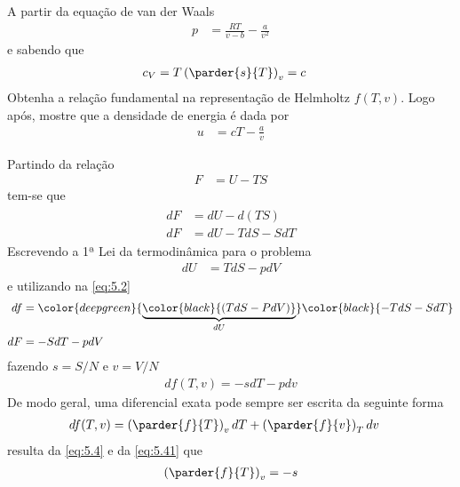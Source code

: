 \begin{prob}
	A partir da equação de van der Waals
	\begin{align}
		p&=\frac{RT}{v-b}-\frac{a}{v^2}
	\end{align}
	e sabendo que
	\begin{align}
		\label{eq:calor-especifico-vcte}
		c_V&=T\left(\parder{s}{T}\right)_v=c
	\end{align}
	Obtenha a relação fundamental na representação de Helmholtz $f(T,v)$. Logo após, mostre que a densidade de energia é dada por
	\begin{align}
		u&=cT-\frac{a}{v}
	\end{align}
	\begin{sol}
		Partindo da relação
		\begin{align}
			\label{eq:5.1}
			F&=U-TS
		\end{align}
		tem-se que
		\begin{align}
			\label{eq:5.2}
			\begin{split}
				dF&=dU-d(TS)\\
				dF&=dU-TdS-SdT
			\end{split}
		\end{align}
		Escrevendo a 1ª Lei da termodinâmica para o problema
		\begin{align}			
			dU&=TdS-pdV
			\label{eq:1-lei-termodinamica}
		\end{align}
		e utilizando na \eqref{eq:5.2}
		\begin{align}
			\begin{split}
				df&=\color{deepgreen}{\underbrace{\color{black}{(TdS-PdV)}}_{dU}}\color{black}{-TdS-SdT}\\
				dF&=-SdT-pdV
				\label{eq:5.3}
			\end{split}
		\end{align}
		fazendo $s=S/N$ e $v=V/N$
		\begin{align}
			df(T,v)=-sdT-pdv
			\label{eq:5.4}
		\end{align}
		De modo geral, uma diferencial exata pode sempre ser escrita da seguinte forma
		\begin{align}
			\label{eq:5.41}
			df(T,v)&=\left(\parder{f}{T}\right)_vdT+\left(\parder{f}{v}\right)_Tdv
		\end{align}
		resulta da \eqref{eq:5.4} e da \eqref{eq:5.41} que
		\begin{subequations}
			\begin{align}					
					\left(\parder{f}{T}\right)_v&=-s\label{eq:5.5a}\\

\end{align}
\end{subequations}
\end{sol}
\end{prob}

